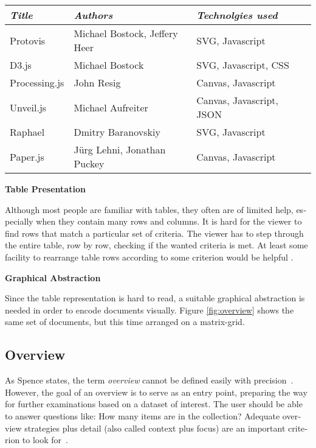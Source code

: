 \begin{english}
\begin{center}
    \begin{tabular}{ | l | l | l | p{2.3cm} |}
    \hline
    \emph{Title} & \emph{Authors} & \emph{Technolgies used} \\ 
    \hline\hline
    Protovis & Michael Bostock, Jeffery Heer & SVG, Javascript  \\ \hline
    D3.js & Michael Bostock & SVG, Javascript, CSS \\ \hline
    Processing.js & John Resig & Canvas, Javascript \\ \hline
    Unveil.js & Michael Aufreiter & Canvas, Javascript, JSON \\ \hline
    Raphael & Dmitry Baranovskiy & SVG, Javascript \\ \hline
    Paper.js & J\"urg Lehni, Jonathan Puckey & Canvas, Javascript \\ \hline
    \end{tabular}
\end{center}

\SuperPar \textbf{Table Presentation}

\SuperPar Although most people are familiar with tables, they often are of limited help, especially when they contain many rows and columns. It is hard for the viewer to find rows that match a particular set of criteria. The viewer has to step through the entire table, row by row, checking if the wanted criteria is met. At least some facility to rearrange table rows according to some criterion would be helpful \cite{InformationVisualization07}.

\SuperPar \textbf{Graphical Abstraction}

\SuperPar Since the table representation is hard to read, a suitable graphical abstraction is needed in order to encode documents visually. Figure \ref{fig:overview} shows the same set of documents, but this time arranged on a matrix-grid.


\subsection{Overview}

As Spence states, the term \emph{overview} cannot be defined easily with precision~\cite{InformationVisualization07}. However, the goal of an overview is to serve as an entry point, preparing the way for further examinations based on a dataset of interest. The user should be able to answer questions like: How many items are in the collection? Adequate overview strategies plus detail (also called context plus focus) are an important criterion to look for~\cite{shneiderman96eyes}.


\end{english}
